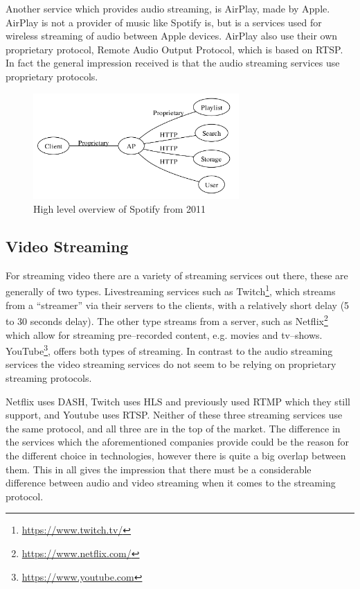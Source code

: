 Another service which provides audio streaming, is AirPlay, made by Apple. 
AirPlay is not a provider of music like Spotify is, but is a services used for wireless streaming of audio between Apple devices.
AirPlay also use their own proprietary protocol, Remote Audio Output Protocol, which is based on \ac{RTSP}.
In fact the general impression received is that the audio streaming services use proprietary protocols.




\begin{figure}[!bht]
    \centering
    \includegraphics[width=0.7\textwidth]{img/spotifyOverview.png}
    \caption{High level overview of Spotify from 2011 \cite{spotifySlides}}
    \label{fig:spotifyOverview}
\end{figure}


\subsection{Video Streaming}
For streaming video there are a variety of streaming services out there, these are generally of two types.
Livestreaming services such as Twitch\footnote{\url{https://www.twitch.tv/}}, which streams from a ``streamer'' via their servers to the clients, with a relatively short delay (5 to 30 seconds delay). 
The other type streams from a server, such as Netflix\footnote{\url{https://www.netflix.com/}} which allow for streaming pre--recorded content, e.g. movies and tv--shows.
YouTube\footnote{\url{https://www.youtube.com}}, offers both types of streaming.
In contrast to the audio streaming services the video streaming services do not seem to be relying on proprietary streaming protocols.

Netflix uses \ac{DASH}, Twitch uses \ac{HLS} and previously used \ac{RTMP} which they still support, and Youtube uses \ac{RTSP}.\cite{netflix}\cite{twitch}\cite{youtube}
Neither of these three streaming services use the same protocol, and all three are in the top of the market.
The difference in the services which the aforementioned companies provide could be the reason for the different choice in technologies, however there is quite a big overlap between them. 
This in all gives the impression that there must be a considerable difference between audio and video streaming when it comes to the streaming protocol.

